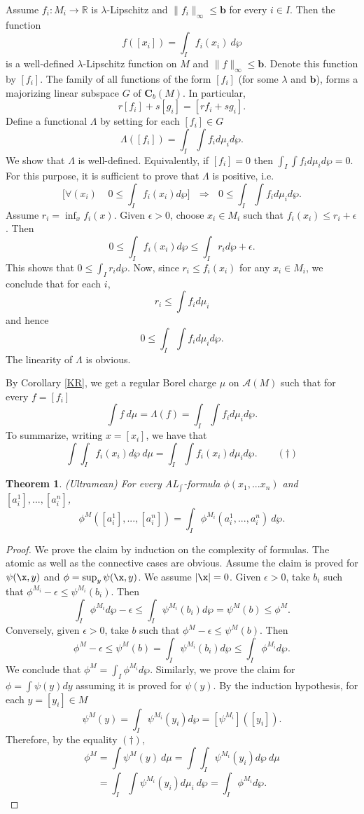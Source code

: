 \documentclass[12pt]{article}
\newtheorem{theorem}{Theorem}[section]
\def\Rn{\mathbb R}
\begin{document}
Assume $f_i:M_i\rightarrow\Rn$ is $\lambda$-Lipschitz and $\|f_i\|_{\infty}\leqslant \mathbf b$ for every $i\in I$.
Then the function $$f([x_i])=\int_I f_i(x_i)\ d\wp$$
is a well-defined $\lambda$-Lipschitz function on $M$ and $\|f\|_{\infty}\leqslant\mathbf b$.
Denote this function by $[f_i]$. The family of all functions of the form $[f_i]$
(for some $\lambda$ and $\mathbf b$), forms a majorizing linear subspace $G$ of $\mathbf{C}_b(M)$.
In particular, $$r[f_i]+s[g_i]=[rf_i+sg_i].$$ Define a functional $\Lambda$ by setting for each $[f_i]\in G$
$$\Lambda([f_i])=\int_I\int f_id\mu_i d\wp.$$
We show that $\Lambda$ is well-defined. %
Equivalently, if $[f_i]=0$ then $\int_I\int f_id\mu_id\wp=0$.
For this purpose, it is sufficient to prove that $\Lambda$ is positive, i.e.
$$\Big[\forall(x_i)\ \ \ \ \ 0\leqslant\int_I f_i(x_i)d\wp\Big]\ \ \ \Longrightarrow\ \ \ 0\leqslant\int_I\int f_id\mu_i d\wp.$$
Assume $r_i=\inf_xf_i(x)$. Given $\epsilon>0$, choose $x_i\in M_i$ such that $f_i(x_i)\leqslant r_i+\epsilon$.
Then $$0\leqslant\int_I f_i(x_i)d\wp\leqslant\int_I r_id\wp+\epsilon.$$
This shows that $0\leqslant\int_I r_id\wp$.
Now, since $r_i\leqslant f_i(x_i)$ for any $x_i\in M_i$, we conclude that for each $i$,
$$r_i\leqslant\int f_i d\mu_i$$ and hence $$0\leqslant\int_I\int f_id\mu_i d\wp.$$
The linearity of $\Lambda$ is obvious.

By Corollary \ref{KR}, %
we get a regular Borel charge $\mu$ on $\mathcal A(M)$
such that for every $f=[f_i]$ $$\int f\ d\mu=\Lambda(f)=\int_I\int f_id\mu_i d\wp.$$
To summarize, writing $x=[x_i]$, we have that
$$\int \int_I f_i(x_i)d\wp \ d\mu=\int_I\int f_i(x_i)d\mu_i  d\wp. \ \ \ \ \ \ \ \ \ (\dag)$$

\begin{theorem} \emph{(Ultramean)}
For every AL$_{\int}$-formula $\phi(x_1,...x_n)$ and $[a^1_i],...,[a^n_i]$,
$$\phi^M([a^1_i],...,[a^n_i])=\int_I\phi^{M_i}(a^1_i,...,a^n_i)\ d\wp.$$
\end{theorem}
\begin{proof} We prove the claim by induction on the complexity of formulas.
The atomic as well as the connective cases are obvious.
Assume the claim is proved for $\psi(\x,y)$ and $\phi=\sup_y\psi(\x,y)$. We assume $|\x|=0$.
Given $\epsilon>0$, take $b_i$ such that $\phi^{M_i}-\epsilon\leqslant\psi^{M_i}(b_i)$.
Then $$\int_I\phi^{M_i}d\wp-\epsilon\leqslant\int_I\psi^{M_i}(b_i)d\wp=\psi^M(b)\leqslant\phi^{M}.$$
Conversely, given $\epsilon>0$, take $b$ such that $\phi^M-\epsilon\leqslant\psi^M(b)$.
Then $$\phi^{M}-\epsilon\leqslant\psi^M(b)=\int_I\psi^{M_i}(b_i)d\wp\leqslant\int_I\phi^{M_i}d\wp.$$
We conclude that $\phi^M=\int_I\phi^{M_i}d\wp$.
Similarly, we prove the claim for $\phi=\int\psi(y)dy$ assuming it is proved for $\psi(y)$.
By the induction hypothesis, for each $y=[y_i]\in M$
$$\psi^M(y)=\int_I\psi^{M_i}(y_i)d\wp=[\psi^{M_i}]([y_i]).$$
Therefore, by the equality $(\dag)$,
$$\phi^M=\int\psi^M(y)\ d\mu=\int\int_I\psi^{M_i}(y_i)d\wp\ d\mu$$
$$=\int_I\int \psi^{M_i}(y_i)d\mu_i\ d\wp=\int_I\phi^{M_i}d\wp.$$
\end{proof}
\end{document}
